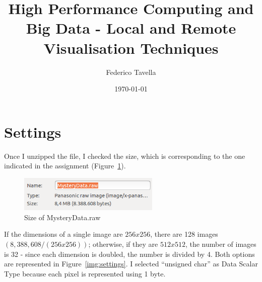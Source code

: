 \documentclass[a4paper]{article}
\title{High Performance Computing and Big Data - Local and Remote Visualisation Techniques}
\author{Federico Tavella}
\date{\today}
\begin{document}
\maketitle

\section{Settings}

Once I unzipped the file, I checked the size, which is corresponding to the one indicated in the assignment (Figure~\ref{img:file_size}).

\begin{figure}[htbp]
\centering
\includegraphics[width=0.6\textwidth]{res/file_size.png}
\caption{Size of MysteryData.raw}
\label{img:file_size}
\end{figure}

If the dimensions of a single image are $256x256$, there are 128 images $(8,388,608/(256x256))$; otherwise, if they are $512x512$, the number of images is 32 - since each dimension is doubled, the number is divided by 4. Both options are represented in Figure~\ref{img:settings}.
I selected “unsigned char” as Data Scalar Type because each pixel is represented using 1 byte.
\end{document}
